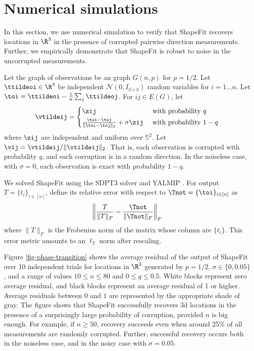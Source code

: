 
\section{Numerical simulations} \label{sec-simulations}


In this section, we use numerical simulation to verify that ShapeFit recovers locations in $\R^3$ in the presence of corrupted pairwise direction measurements.  Further, we empirically demonstrate that ShapeFit is robust to noise in the uncorrupted measurements.

Let the graph of observations be an \erdosrenyi graph $G(n,p)$ for $p = 1/2$.  Let $\ttildeoi \in \R^3$ be independent $\mathcal{N}(0, I_{3\times 3})$ random variables for $i = 1 \ldots n$.   Let $\toi = \ttildeoi - \frac{1}{n} \sum_j \ttildeoj$.
  For $ij \in E(G)$, let
\[
\vtildeij = \begin{cases} \zij & \text{ with probability } q  \\[0.2em]
\frac{\toi - \toj}{\| \toi - \toj\|_2} + \sigma \zij & \text{ with probability } 1-q
\end{cases}
\]
where $\zij$ are independent and uniform over $\mathbb{S}^2$. Let $\vij = \vtildeij / \| \vtildeij\|_2$. That is, each observation is corrupted with probability $q$, and each corruption is in a random direction.  In the noiseless case, with $\sigma = 0$, each observation is exact with probability $1-q$.  

We solved ShapeFit using the SDPT3 solver \cite{TTT1999, TTT2003} and YALMIP \cite{L2004}.  For output $T = \{ t_i\}_{i \in [n]}$, define its relative error with respect to $\Tnot = \{\toi\}_{i \in [n]}$ as
\[
\left \| \frac{T}{\|T\|_F} - \frac{\Tnot}{\|\Tnot\|_F} \right \|_F
\]
where $\|T\|_F$ is the Frobenius norm of the matrix whose column are $\{t_i\}$.    This error metric amounts to an $\ell_2$ norm after rescaling.

Figure \ref{fig-phase-transition} shows the average residual of the output of ShapeFit over 10 independent trials for locations in $\R^3$ generated by $p = 1/2$, $\sigma \in \{0, 0.05\}$, and a range of values $10 \leq n \leq 80$ and $0 \leq q \leq 0.5$.  White blocks represent zero average residual, and black blocks represent an average residual of 1 or higher.  Average residuals between $0$ and $1$ are represented by the appropriate shade of gray.  The figure shows that ShapeFit successfully recovers 3d locations in the presence of a surprisingly large probability of corruption, provided $n$ is big enough. For example, if $n \geq 50$, recovery succeeds even when around 25\% of all measurements are randomly corrupted.  Further, successful recovery occurs both in the noiseless case, and in the noisy case with $\sigma=0.05$.  


